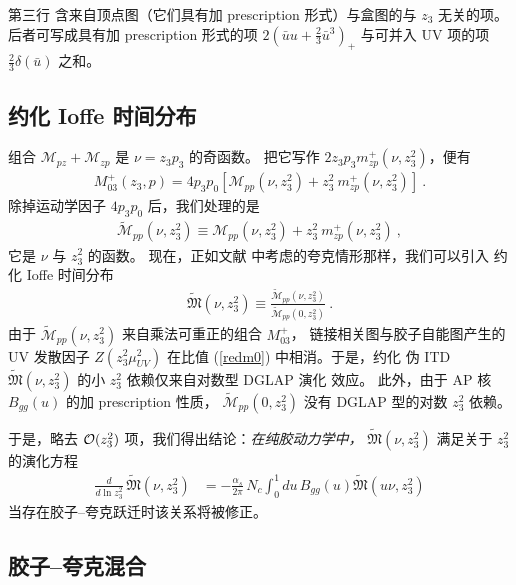 第三行
含来自顶点图（它们具有加 prescription 形式）与盒图的与 $z_3$ 无关的项。
后者可写成具有加 prescription 形式的项 $2 \left (\bar uu +  \frac{2}{3}\bar u^3  \right )_{+}$
与可并入 UV 项的项 $\frac23 \delta (\bar u)$ 之和。

\subsection{约化 Ioffe 时间分布}

组合 $\mathcal{M}_{pz} +\mathcal{M}_{zp}$ 是 $\nu =z_3 p_3$ 的奇函数。
把它写作 $2 z_3 p_3 m^+_{zp} (\nu, z_3^2)$，便有
\begin{align}
M_{03} ^+(z_3, p) = 4 p_3 p_0 [ \mathcal{M}_{pp} (\nu, z_3^2 ) +
z_3^2 \ m^+_{zp} (\nu, z_3^2 )] \ .
\label{M03p}
\end{align}
除掉运动学因子 $4 p_3 p_0$ 后，我们处理的是
\begin{align}
\widetilde{\mathcal{M}}_{pp}(\nu, z_3^2 ) \equiv
\mathcal{M}_{pp}(\nu, z_3^2 ) +
z_3^2 \ m^+_{zp} (\nu, z_3^2 ) \ ,
\end{align}
它是 $\nu$ 与 $z_3^2$ 的函数。
现在，正如文献 \cite{Radyushkin:2017cyf,Orginos:2017kos} 中考虑的夸克情形那样，我们可以引入
约化 Ioffe 时间分布
\begin{align}
\widetilde{\mathfrak M} (\nu, z_3^2) \equiv \frac{\widetilde{\mathcal{M}}_{pp}(\nu, z_3^2)}{\widetilde{\mathcal{M}}_{pp} (0, z_3^2)} \ .
\label{redm0}
\end{align}
由于 $\widetilde{\mathcal{M}}_{pp}(\nu, z_3^2)$ 来自乘法可重正的组合 $M_{03} ^+$，
链接相关图与胶子自能图产生的
UV 发散因子 $Z(z_3^2 \mu^2_{UV})$ 在比值 (\ref{redm0}) 中相消。于是，约化
伪 ITD $\widetilde{\mathfrak M} (\nu, z_3^2)$ 的小 $z_3^2$ 依赖仅来自对数型 DGLAP 演化
效应。
此外，由于 AP 核 $B_{gg} (u)$ 的加 prescription 性质，
$\widetilde{\mathcal{M}}_{pp}(0, z_3^2)$
没有 DGLAP 型的对数 $z_3^2$ 依赖。

于是，略去 ${\cal O} (z_3^2)$ 项，我们得出结论：{\it 在纯胶动力学中，}
$\widetilde{\mathfrak M} (\nu, z_3^2)$ 满足关于
$z_3^2$ 的演化方程
\begin{align}
\frac{d}{d \ln z_3^2} \,
\widetilde{\mathfrak M} (\nu, z_3^2) &= - \frac{\alpha_s}{2\pi} \, N_c
\int_0^1 du \, B_{gg} (u) \widetilde{\mathfrak M} (u \nu, z_3^2)
\label{EE}
\end{align}
当存在胶子--夸克跃迁时该关系将被修正。

\subsection{胶子--夸克混合}

